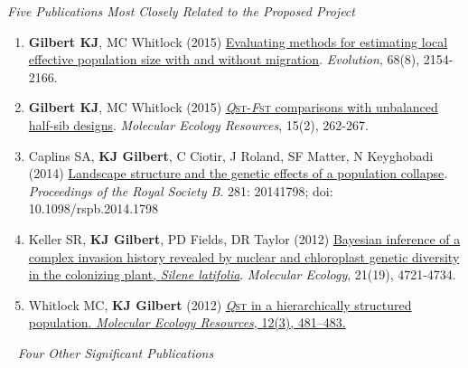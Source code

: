 \emph{Five Publications Most Closely Related to the Proposed Project}
\vspace{4pt}
%
\begin{enumerate}[nolistsep]
\item \textbf{Gilbert KJ}, MC Whitlock (2015) \href{http://onlinelibrary.wiley.com/doi/10.1111/evo.12713/abstract}{Evaluating methods for estimating local effective population size with and without migration}. \emph{Evolution}, 68(8), 2154-2166.


\item \textbf{Gilbert KJ}, MC Whitlock (2015) \href{http://onlinelibrary.wiley.com/doi/10.1111/1755-0998.12303/abstract}{\emph{Q}\footnotesize{\textsc{st}}-\normalsize \emph{F}\footnotesize{\textsc{st}} \normalsize comparisons with unbalanced half-sib designs}. \emph{Molecular Ecology Resources}, 15(2), 262-267.

\item Caplins SA, \textbf{KJ Gilbert}, C Ciotir, J Roland, SF Matter, N Keyghobadi (2014) \href{http://m.rspb.royalsocietypublishing.org/content/281/1796/20141798.abstract?cpetoc}{Landscape structure and the genetic effects of a population collapse}. \emph{Proceedings of the Royal Society B}. 281: 20141798; doi: 10.1098/rspb.2014.1798 
   
\item Keller SR, \textbf{KJ Gilbert}, PD Fields, DR Taylor (2012) \href {http://onlinelibrary.wiley.com/doi/10.1111/j.1365-294X.2012.05751.x/abstract}{Bayesian inference of a complex invasion history revealed by nuclear and chloroplast genetic diversity in the colonizing plant, \emph{Silene latifolia}}. \emph{Molecular Ecology}, 21(19), 4721-4734.

\item Whitlock MC, \textbf{KJ Gilbert} (2012) \href {http://onlinelibrary.wiley.com/doi/10.1111/j.1755-0998.2012.03122.x/abstract}{ \emph{Q}\footnotesize{\textsc{st}} \normalsize{in a hierarchically structured population}. \emph{Molecular Ecology Resources}, 12(3), 481--483.} 
    
\end{enumerate}

\vspace{2pt}
\noindent
~ \emph{Four Other Significant Publications}
\vspace{2pt}

